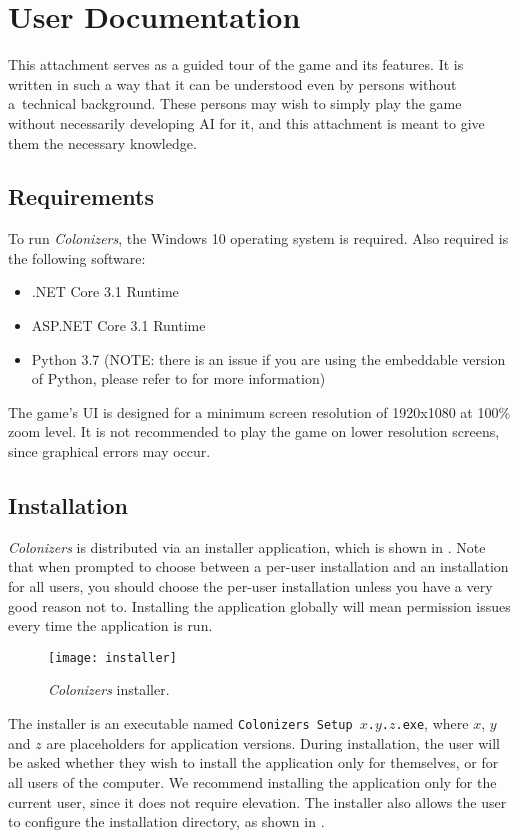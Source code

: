 \section{User Documentation}
\label{sec:userdocs}

This attachment serves as a guided tour of the game and its features.
It is written in such a way that it can be understood even by persons
without a~technical background. These persons may wish to simply
play the game without necessarily developing AI for it, and this attachment
is meant to give them the necessary knowledge.

\subsection{Requirements}

To run \emph{Colonizers}, the Windows 10 operating system is required.
Also required is the following software:
\begin{itemize}
    \item .NET Core 3.1 Runtime
    \item ASP.NET Core 3.1 Runtime
    \item Python 3.7 (NOTE: there is an issue if you are using the embeddable
        version of Python, please refer to  for more information)
\end{itemize}
The game's UI is designed for a minimum screen resolution of 1920x1080 at
100\% zoom level. It is not recommended to play the game on lower resolution
screens, since graphical errors may occur.

\subsection{Installation}

\emph{Colonizers} is distributed via an installer application, which is shown
in . Note that when prompted to choose between a per-user
installation and an installation for all users, you should choose the per-user
installation unless you have a very good reason not to. Installing the application
globally will mean permission issues every time the application is run.

\begin{figure}[ht]
\centerline{\mbox{\texttt{[image: installer]}}}
\caption{\emph{Colonizers} installer.}\label{ud:installer}
\end{figure}

The installer is an executable named \texttt{Colonizers Setup $x$.$y$.$z$.exe},
where $x$, $y$ and $z$ are placeholders for application versions. During installation,
the user will be asked whether they wish to install the application only for themselves,
or for all users of the computer. We recommend installing the application
only for the current user, since it does not require elevation. The installer
also allows the user to configure the installation directory,
as shown in .

